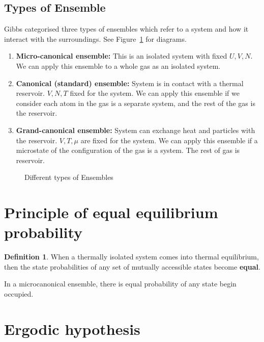 \documentclass[12pt,chapterprefix=false,dvipsnames]{scrbook}
\theoremstyle{dotless}
\theoremstyle{definition}
\newtheorem{protodefinition}{Definition}[section]
\newenvironment{definition}
{\colorlet{shadecolor}{black!15}\begin{shaded}\begin{protodefinition}}
			{\end{protodefinition}\end{shaded}}
\begin{document}
\subsection{Types of Ensemble}%
\label{sub:types_of_ensemble}

Gibbs categorised three types of ensembles which refer to a
system and how it interact with the surroundings. See
Figure~\ref{fig:ensemble_types} for diagrams.

\begin{enumerate}
	\item \textbf{Micro-canonical ensemble:} This is an isolated system with fixed
	      $U, V, N$. We can apply this ensemble to a whole
	      gas as an isolated system.
	\item \textbf{Canonical (standard) ensemble:} System is in contact with a thermal
	      reservoir. $V, N, T$ fixed for the system. We can
	      apply this ensemble if we consider each atom in the gas is a
	      separate system, and the rest of the gas is the reservoir.
	\item \textbf{Grand-canonical ensemble:} System can exchange heat and particles
	      with the reservoir. $V, T, \mu$  are fixed for the
	      system. We can apply this ensemble if a microstate of the
	      configuration of the gas is a system. The rest of gas is
	      reservoir.
\end{enumerate}

\begin{figure}[htpb]
	\centering
	
	\caption{Different types of Ensembles}%
	\label{fig:ensemble_types}
\end{figure}

\section{Principle of equal equilibrium probability}%
\label{sec:principle_of_equal_equilibrium_probability}

\begin{definition}
	When a thermally isolated system comes into thermal equilibrium,
	then the state probabilities of any set of mutually accessible
	states become \textbf{equal}.

	In a microcanonical ensemble, there is equal probability of any
	state begin occupied.
\end{definition}

\section{Ergodic hypothesis}%
\label{sec:ergodic_hypothesis}
\end{document}
